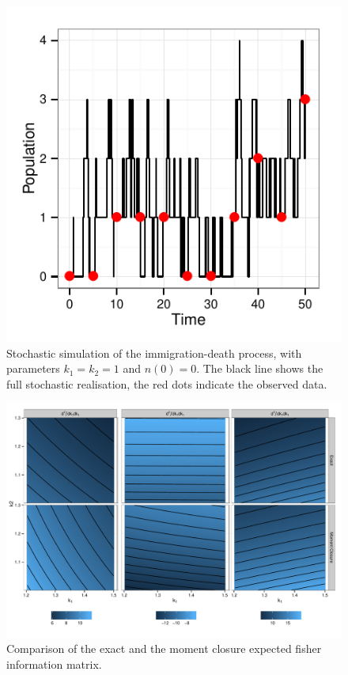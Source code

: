 \documentclass{pnastwo}
\begin{document}



\begin{figure}[ht]
\begin{center}
\centerline{\includegraphics[]{../graphics/figure1}}
\end{center}
\caption{Stochastic simulation of the immigration-death process, with parameters
$k_1=k_2=1$ and $n(0)=0$. The black line shows the full stochastic realisation, 
the red dots indicate the observed data.}\label{F1}
\end{figure}
\begin{figure}[ht]
\begin{center}
\centerline{\includegraphics[width=.7\textwidth]{../graphics/figure2}}
\caption{Comparison of the exact and the moment closure expected fisher information matrix. }
\label{F2}
\end{center}
\end{figure}
% 
\end{document}
